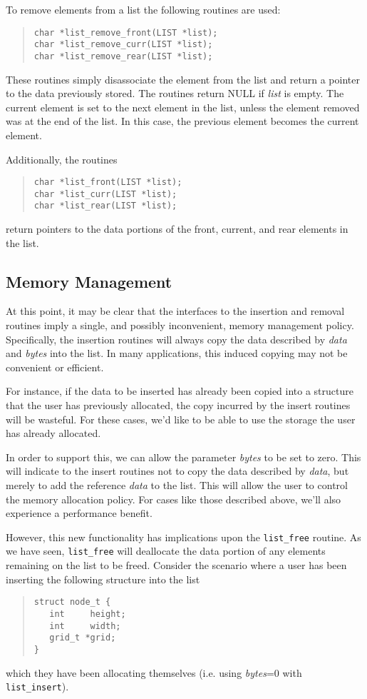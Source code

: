 \documentclass[fullpage,11pt]{article}
\begin{document}
To remove elements from a list the following routines are used:
\begin{quote}
\begin{verbatim}
char *list_remove_front(LIST *list);
char *list_remove_curr(LIST *list);
char *list_remove_rear(LIST *list);
\end{verbatim}
\end{quote}
These routines simply disassociate the element from the list and return
a pointer to the data previously stored.  The routines return NULL if
{\em list} is empty.  The current element is set to the next element in
the list, unless the element removed was at the end of the list.  In this
case, the previous element becomes the current element.

Additionally, the routines
\begin{quote}
\begin{verbatim}
char *list_front(LIST *list);
char *list_curr(LIST *list);
char *list_rear(LIST *list);
\end{verbatim}
\end{quote}
return pointers to the data portions of the front, current, and rear elements
in the list.

\subsection{Memory Management}
At this point, it may be clear that the interfaces to the insertion
and removal routines imply a single, and possibly inconvenient, memory
management policy.  Specifically, the insertion routines will always
copy the data described by {\em data} and {\em bytes} into the list.  In
many applications, this induced copying may not be convenient or efficient.

For instance, if the data to be inserted has already been copied into a
structure that the user has previously allocated, the copy incurred by the
insert routines will be wasteful.  For these cases, we'd like to be able to
use the storage the user has already allocated.

In order to support this, we can allow the parameter {\em bytes} to be set to
zero.  This will indicate to the insert routines not to copy the data
described by {\em data}, but merely to add the reference {\em data} to the
list.  This will allow the user to control the memory allocation policy.  For
cases like those described above, we'll also experience a performance benefit.

However, this new functionality has implications upon the {\tt list\_free}
routine.  As we have seen, {\tt list\_free} will deallocate the data portion
of any elements remaining on the list to be freed.  Consider the scenario
where a user has been inserting the following structure into the list
\begin{quote}
\begin{verbatim}
struct node_t {
   int     height;
   int     width;
   grid_t *grid;
}
\end{verbatim}
\end{quote}
which they have been allocating themselves (i.e. using {\em bytes}=0 with
{\tt list\_insert}).
\end{document}
